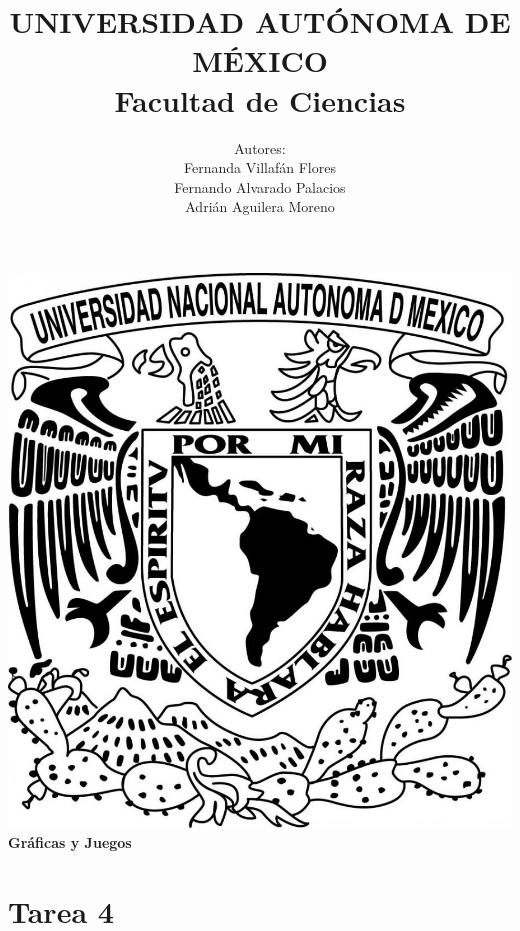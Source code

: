 \documentclass{article}
\begin{document}
  \title{UNIVERSIDAD AUT\'ONOMA DE M\'EXICO\\ Facultad de Ciencias}
  \author{Autores:
    \\ Fernanda Villaf\'an Flores
    \\ Fernando Alvarado Palacios
    \\ Adri\'an Aguilera Moreno}
  \date{}
  \maketitle
  \begin{center}
    \includegraphics[scale=0.20]{../Imagen/Portada.jpg}\\[0.4cm]
    \Large
    \bf{Gr\'aficas y Juegos}
    \normalsize
  \end{center}
  \newpage
  \section*{\LARGE{Tarea 4}}
\end{document}
